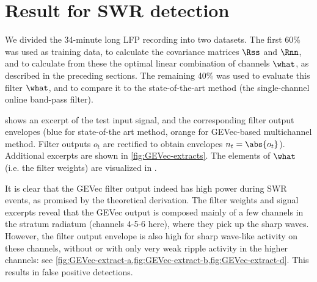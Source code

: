 \section{Result for SWR detection}

We divided the 34-minute long LFP recording into two datasets. The first 60\% was used as training data, to calculate the covariance matrices $\Rss$ and $\Rnn$, and to calculate from these the optimal linear combination of channels $\what$, as described in the preceding sections. The remaining 40\% was used to evaluate this filter $\what$, and to compare it to the state-of-the-art method (the single-channel online band-pass filter).\footnotemark{}


\begin{figure}
\label{fig:LSM-comp}
\end{figure}

 shows an excerpt of the test input signal, and the corresponding filter output envelopes (blue for state-of-the art method, orange for GEVec-based multichannel method. Filter outputs $o_t$ are rectified to obtain envelopes $n_t = \abs{o_t}$). Additional excerpts are shown in \cref{fig:GEVec-extracts}. The elements of $\what$ (i.e. the filter weights) are visualized in .

It is clear that the GEVec filter output indeed has high power during SWR events, as promised by the theoretical derivation. The filter weights and signal excerpts reveal that the GEVec output is composed mainly of a few channels in the stratum radiatum (channels 4-5-6 here), where they pick up the sharp waves. However, the filter output envelope is also high for sharp wave-like activity on these channels, without or with only very weak ripple activity in the higher channels: see \cref{fig:GEVec-extract-a,fig:GEVec-extract-b,fig:GEVec-extract-d}. This results in false positive detections.

